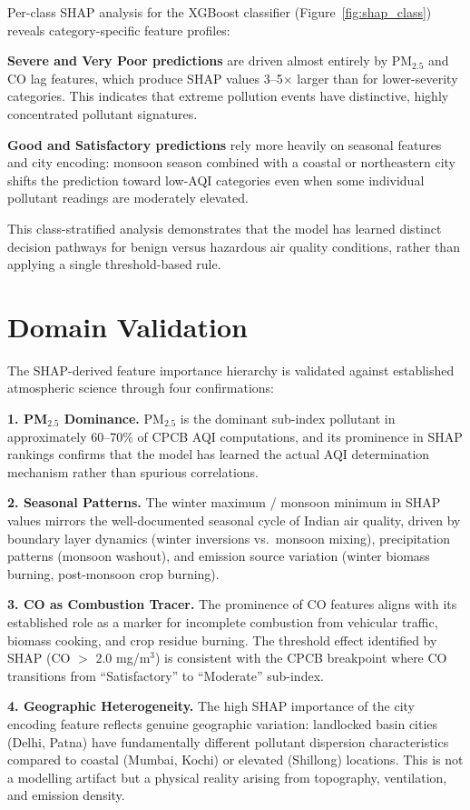 \documentclass[12pt,a4paper]{report}
\begin{document}
Per-class SHAP analysis for the XGBoost classifier (Figure~\ref{fig:shap_class}) reveals category-specific feature profiles:

\textbf{Severe and Very Poor predictions} are driven almost entirely by PM$_{2.5}$ and CO lag features, which produce SHAP values 3--5$\times$ larger than for lower-severity categories. This indicates that extreme pollution events have distinctive, highly concentrated pollutant signatures.

\textbf{Good and Satisfactory predictions} rely more heavily on seasonal features and city encoding: monsoon season combined with a coastal or northeastern city shifts the prediction toward low-AQI categories even when some individual pollutant readings are moderately elevated.

This class-stratified analysis demonstrates that the model has learned distinct decision pathways for benign versus hazardous air quality conditions, rather than applying a single threshold-based rule.

\section*{Domain Validation}

The SHAP-derived feature importance hierarchy is validated against established atmospheric science through four confirmations:

\textbf{1. PM$_{2.5}$ Dominance.} PM$_{2.5}$ is the dominant sub-index pollutant in approximately 60--70\% of CPCB AQI computations, and its prominence in SHAP rankings confirms that the model has learned the actual AQI determination mechanism rather than spurious correlations.

\textbf{2. Seasonal Patterns.} The winter maximum / monsoon minimum in SHAP values mirrors the well-documented seasonal cycle of Indian air quality, driven by boundary layer dynamics (winter inversions vs.\ monsoon mixing), precipitation patterns (monsoon washout), and emission source variation (winter biomass burning, post-monsoon crop burning).

\textbf{3. CO as Combustion Tracer.} The prominence of CO features aligns with its established role as a marker for incomplete combustion from vehicular traffic, biomass cooking, and crop residue burning. The threshold effect identified by SHAP (CO $>$ 2.0 mg/m$^3$) is consistent with the CPCB breakpoint where CO transitions from ``Satisfactory'' to ``Moderate'' sub-index.

\textbf{4. Geographic Heterogeneity.} The high SHAP importance of the city encoding feature reflects genuine geographic variation: landlocked basin cities (Delhi, Patna) have fundamentally different pollutant dispersion characteristics compared to coastal (Mumbai, Kochi) or elevated (Shillong) locations. This is not a modelling artifact but a physical reality arising from topography, ventilation, and emission density.
\end{document}
